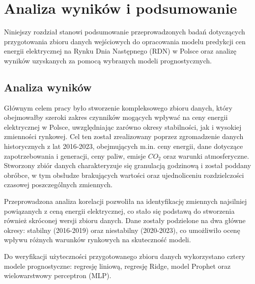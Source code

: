 \chapter{Analiza wyników i podsumowanie}
\label{ch:podsumowanie}

Niniejszy rozdział stanowi podsumowanie przeprowadzonych badań dotyczących przygotowania zbioru danych wejściowych do opracowania modelu predykcji cen energii elektrycznej na Rynku Dnia Następnego (RDN) w Polsce oraz analizę wyników uzyskanych za pomocą wybranych modeli prognostycznych.

\section{Analiza wyników}
\label{sec:analiza_wynikow}

Głównym celem pracy było stworzenie kompleksowego zbioru danych, który obejmowałby szeroki zakres czynników mogących wpływać na ceny energii elektrycznej w Polsce, uwzględniając zarówno okresy stabilności, jak i wysokiej zmienności rynkowej. Cel ten został zrealizowany poprzez zgromadzenie danych historycznych z lat 2016-2023, obejmujących m.in. ceny energii, dane dotyczące zapotrzebowania i generacji, ceny paliw, emisje $CO_{2}$ oraz warunki atmosferyczne. Stworzony zbiór danych charakteryzuje się granulacją godzinową i został poddany obróbce, w tym obsłudze brakujących wartości oraz ujednoliceniu rozdzielczości czasowej poszczególnych zmiennych.

Przeprowadzona analiza korelacji pozwoliła na identyfikację zmiennych najsilniej powiązanych z ceną energii elektrycznej, co stało się podstawą do stworzenia również skróconej wersji zbioru danych. Dane zostały podzielone na dwa główne okresy: stabilny (2016-2019) oraz niestabilny (2020-2023), co umożliwiło ocenę wpływu różnych warunków rynkowych na skuteczność modeli.

Do weryfikacji użyteczności przygotowanego zbioru danych wykorzystano cztery modele prognostyczne: regresję liniową, regresję Ridge, model Prophet oraz wielowarstwowy perceptron (MLP).

